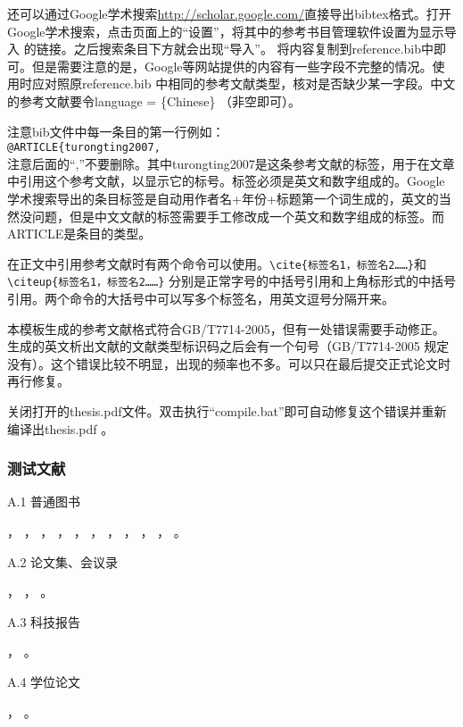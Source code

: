 还可以通过Google学术搜索\url{http://scholar.google.com/}直接导出bibtex格式。打开Google学术搜索，点击页面上的“设置”，将其中的参考书目管理软件设置为显示导入\BibTeX{} 的链接。之后搜索条目下方就会出现“导入\BibTeX{}”。 将内容复制到reference.bib中即可。但是需要注意的是，Google等网站提供的内容有一些字段不完整的情况。使用时应对照原reference.bib 中相同的参考文献类型，核对是否缺少某一字段。中文的参考文献要令language = \{Chinese\} （非空即可）。

注意bib文件中每一条目的第一行例如：\\
\verb|@ARTICLE{turongting2007,|\\
注意后面的“,”不要删除。其中turongting2007是这条参考文献的标签，用于在文章中引用这个参考文献，以显示它的标号。标签必须是英文和数字组成的。Google 学术搜索导出的条目标签是自动用作者名+年份+标题第一个词生成的，英文的当然没问题，但是中文文献的标签需要手工修改成一个英文和数字组成的标签。而ARTICLE是条目的类型。

在正文中引用参考文献时有两个命令可以使用。\verb|\cite{标签名1，标签名2……}|和\verb|\citeup{标签名1，标签名2……}| 分别是正常字号的中括号引用和上角标形式的中括号引用。两个命令的大括号中可以写多个标签名，用英文逗号分隔开来。\par

本模板生成的参考文献格式符合GB/T7714-2005，但有一处错误需要手动修正。生成的英文析出文献的文献类型标识码之后会有一个句号（GB/T7714-2005 规定没有）。这个错误比较不明显，出现的频率也不多。可以只在最后提交正式论文时再行修复。

关闭打开的thesis.pdf文件。双击执行“compile.bat”即可自动修复这个错误并重新编译出thesis.pdf 。

\subsubsection{测试文献}


A.1 普通图书

\cite{gxzzzzqlyt1993}，
\cite{jiangyouxu1998}，
\cite{tangxujun1999}，
\cite{zhaokaihua1995}，
\cite{wangang1912}，
\cite{zhaoyaodong1998}，
\cite{crawfprd1995}，
\cite{iflai1977}，
\cite{obrien1994}，
\cite{rood2001}，
\cite{angwen1988}。

A.2 论文集、会议录

\cite{zglxxh1990}，
\cite{ROSENTHALL1963}，
\cite{GANZHA2000}。

A.3 科技报告

\cite{dtha1990}，
\cite{who1970}。

A.4 学位论文

\cite{ZHANGZHIXIANG1998}，
\cite{CALMS1965}。

